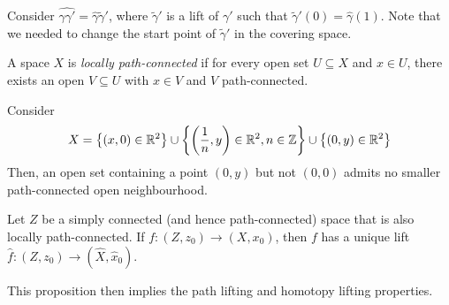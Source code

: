 Consider \( \widehat{\gamma\gamma'} = \hat\gamma\widetilde\gamma' \), where \( \widetilde\gamma' \) is a lift of \( \gamma' \) such that \( \widetilde\gamma'(0) = \hat\gamma(1) \).
Note that we needed to change the start point of \( \widetilde\gamma' \) in the covering space.
\begin{definition}
	A space \( X \) is \emph{locally path-connected} if for every open set \( U \subseteq X \) and \( x \in U \), there exists an open \( V \subseteq U \) with \( x \in V \) and \( V \) path-connected.
\end{definition}
\begin{example}
	Consider
	\[ X = \qty{(x,0) \in \mathbb R^2} \cup \qty{\qty(\frac{1}{n}, y) \in \mathbb R^2, n \in \mathbb Z} \cup \qty{(0,y) \in \mathbb R^2} \]
	Then, an open set containing a point \( (0,y) \) but not \( (0,0) \) admits no smaller path-connected open neighbourhood.
\end{example}
\begin{proposition}
	Let \( Z \) be a simply connected (and hence path-connected) space that is also locally path-connected.
	If \( f \colon (Z,z_0) \to (X,x_0) \), then \( f \) has a unique lift \( \hat f \colon (Z,z_0) \to (\hat X, \hat x_0) \).
\end{proposition}
\begin{remark}
	This proposition then implies the path lifting and homotopy lifting properties.
\end{remark}

